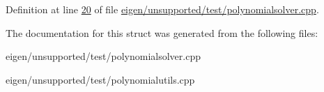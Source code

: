 Definition at line \hyperlink{eigen_2unsupported_2test_2polynomialsolver_8cpp_source_l00020}{20} of file \hyperlink{eigen_2unsupported_2test_2polynomialsolver_8cpp_source}{eigen/unsupported/test/polynomialsolver.\+cpp}.



The documentation for this struct was generated from the following files\+:\begin{DoxyCompactItemize}
\item 
eigen/unsupported/test/polynomialsolver.\+cpp\item 
eigen/unsupported/test/polynomialutils.\+cpp\end{DoxyCompactItemize}
